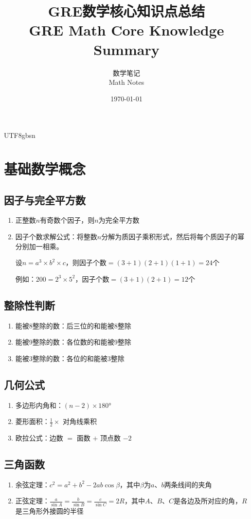 \documentclass[12pt]{article}
\title{GRE数学核心知识点总结 \\ GRE Math Core Knowledge Summary}
\author{数学笔记 \\ Math Notes}
\date{\today}
\begin{document}
\begin{CJK*}{UTF8}{gbsn}

\maketitle

\section{基础数学概念}

\subsection{因子与完全平方数}
\begin{enumerate}
    \item 正整数$n$有奇数个因子，则$n$为完全平方数
    \item 因子个数求解公式：将整数$n$分解为质因子乘积形式，然后将每个质因子的幂分别加一相乘。
    
    设$n = a^3 \times b^2 \times c$，则因子个数$= (3+1)(2+1)(1+1) = 24$个
    
    例如：$200 = 2^3 \times 5^2$，因子个数$= (3+1)(2+1) = 12$个
\end{enumerate}

\subsection{整除性判断}
\begin{enumerate}
    \item 能被8整除的数：后三位的和能被8整除
    \item 能被9整除的数：各位数的和能被9整除
    \item 能被3整除的数：各位的和能被3整除
\end{enumerate}

\subsection{几何公式}
\begin{enumerate}
    \item 多边形内角和：$(n-2) \times 180°$
    \item 菱形面积：$\frac{1}{2} \times$ 对角线乘积
    \item 欧拉公式：边数 $=$ 面数 $+$ 顶点数 $-2$
\end{enumerate}

\subsection{三角函数}
\begin{enumerate}
    \item 余弦定理：$c^2 = a^2 + b^2 - 2ab\cos\beta$，其中$\beta$为$a$、$b$两条线间的夹角
    \item 正弦定理：$\frac{a}{\sin A} = \frac{b}{\sin B} = \frac{c}{\sin C} = 2R$，其中$A$、$B$、$C$是各边及所对应的角，$R$是三角形外接圆的半径
\end{enumerate}


\end{CJK*}
\end{document}
